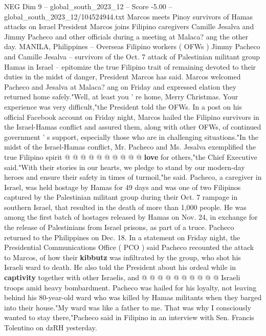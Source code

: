 \begin{textsample}{NEG Dim 9 – global\_south\_2023\_12 – Score -5.00 – global\_south\_2023\_12/104524944.txt}  \label{ex:f9_neg_308}
Marcos meets Pinoy survivors of Hamas attacks on Israel President Marcos joins Filipino caregivers Camille Jesalva and Jimmy Pacheco and other officials during a meeting at Malaca? ang the other day.
MANILA, Philippines -- Overseas Filipino workers ( OFWs ) Jimmy Pacheco and Camille Jesalva -- survivors of the Oct. 7 attack of Palestinian militant group Hamas in Israel -- epitomize the true Filipino trait of remaining devoted to their duties in the midst of danger, President Marcos has said.
Marcos welcomed Pacheco and Jesalva at Malaca? ang on Friday and expressed elation they returned home safely."Well, at least you ' re home, Merry Christmas.
Your experience was very difficult,"the President told the OFWs.
In a post on his official Facebook account on Friday night, Marcos hailed the Filipino survivors in the Israel-Hamas conflict and assured them, along with other OFWs, of continued government ' s support, especially those who are in challenging situations."In the midst of the Israel-Hamas conflict, Mr.
Pacheco and Ms.
Jesalva exemplified the true Filipino spirit @ @ @ @ @ @ @ @ @ @ \textbf{love} for others,"the Chief Executive said."With their stories in our hearts, we pledge to stand by our modern-day heroes and ensure their safety in times of turmoil,"he said.
Pacheco, a caregiver in Israel, was held hostage by Hamas for 49 days and was one of two Filipinos captured by the Palestinian militant group during their Oct. 7 rampage in southern Israel, that resulted in the death of more than 1,000 people.
He was among the first batch of hostages released by Hamas on Nov. 24, in exchange for the release of Palestinians from Israel prisons, as part of a truce.
Pacheco returned to the Philippines on Dec. 18.
In a statement on Friday night, the Presidential Communications Office ( PCO ) said Pacheco recounted the attack to Marcos, of how their \textbf{kibbutz} was infiltrated by the group, who shot his Israeli ward to death.
He also told the President about his ordeal while in \textbf{captivity} together with other Israelis, and @ @ @ @ @ @ @ @ @ @ Israeli troops amid heavy bombardment.
Pacheco was hailed for his loyalty, not leaving behind his 80-year-old ward who was killed by Hamas militants when they barged into their house."My ward was like a father to me.
That was why I consciously wanted to stay there,"Pacheco said in Filipino in an interview with Sen.
Francis Tolentino on dzRH yesterday.

\end{textsample}

